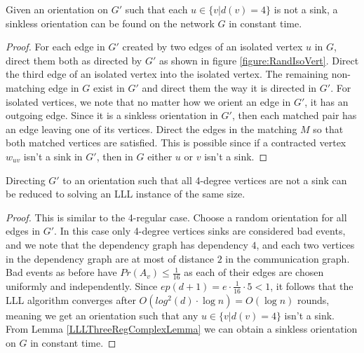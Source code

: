 \begin{lemma}
Given an orientation on $G'$ such that each $u \in \{v|d(v)=4\}$ is not a sink, a sinkless orientation can be found on the network $G$ in constant time.
\end{lemma}
\begin{proof}
\label{LLLThreeRegComplexLemma}
For each edge in $G'$ created by two edges of an isolated vertex $u$ in $G$, direct them both as directed by $G'$ as shown in figure \ref{figure:RandIsoVert}. Direct the third edge of an isolated vertex into the isolated vertex. The remaining non-matching edge in $G$ exist in $G'$ and direct them the way it is directed in $G'$. For isolated vertices, we note that no matter how we orient an edge in $G'$, it has an outgoing edge. Since it is a sinkless orientation in $G'$, then each matched pair has an edge leaving one of its vertices. Direct the edges in the matching $M$ so that both matched vertices are satisfied. This is possible since if a contracted vertex $w_{uv}$ isn't a sink in $G'$, then in $G$ either $u$ or $v$ isn't a sink.
\end{proof}

\begin{lemma}
Directing $G'$ to an orientation such that all 4-degree vertices are not a sink can be reduced to solving an LLL instance of the same size.
\end{lemma}
\begin{proof}
This is similar to the 4-regular case. Choose a random orientation for all edges in $G'$. In this case only 4-degree vertices sinks are considered bad events, and we note that the dependency graph has dependency $4$, and each two vertices in the dependency graph are at most of distance $2$ in the communication graph. Bad events as before have $Pr(A_v) \leq \frac{1}{16}$ as each of their edges are chosen uniformly and independently.  Since $ep(d+1) = e\cdot \frac{1}{16}\cdot 5 < 1$, it follows that the LLL algorithm converges after $O(log^2(d) \cdot \log{n}) = O(\log{n})$ rounds, meaning we get an orientation such that any $u \in \{v|d(v)=4\}$ isn't a sink. From Lemma \ref{LLLThreeRegComplexLemma} we can obtain a sinkless orientation on $G$ in constant time.
\end{proof}


